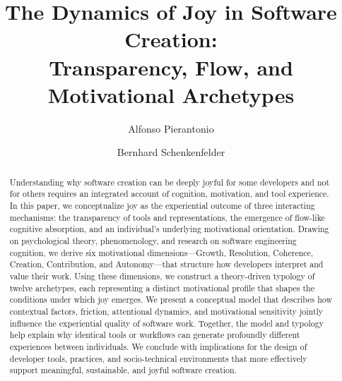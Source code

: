 \documentclass[12pt]{elsarticle}
\begin{document}
\begin{frontmatter}

\title{The Dynamics of Joy in Software Creation:\\
Transparency, Flow, and Motivational Archetypes}

\author[univaq]{Alfonso Pierantonio}

\author[scch]{Bernhard Schenkenfelder}




\begin{abstract}
Understanding why software creation can be deeply joyful for some 
developers and not for others requires an integrated account of 
cognition, motivation, and tool experience. In this paper, we 
conceptualize joy as the experiential outcome of three interacting 
mechanisms: the transparency of tools and representations, the 
emergence of flow-like cognitive absorption, and an individual's 
underlying motivational orientation. Drawing on psychological 
theory, phenomenology, and research on software engineering 
cognition, we derive six motivational dimensions---Growth, 
Resolution, Coherence, Creation, Contribution, and Autonomy---that 
structure how developers interpret and value their work. Using these 
dimensions, we construct a theory-driven typology of twelve 
archetypes, each representing a distinct motivational profile that 
shapes the conditions under which joy emerges. We present a 
conceptual model that describes how contextual factors, friction, 
attentional dynamics, and motivational sensitivity jointly influence 
the experiential quality of software work. Together, the model and 
typology help explain why identical tools or workflows can generate 
profoundly different experiences between individuals. We conclude 
with implications for the design of developer tools, practices, and 
socio-technical environments that more effectively support 
meaningful, sustainable, and joyful software creation.
\end{abstract}


\end{frontmatter}
\end{document}
